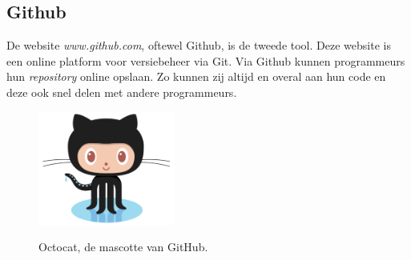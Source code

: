 \subsection{Github}

De website \textit{www.github.com}, oftewel Github, is de tweede tool.
Deze website is een online platform voor versiebeheer via Git. Via Github kunnen programmeurs hun \textit{repository} online opslaan.\cite{git:hello_world} Zo kunnen zij altijd en overal aan hun code en deze ook snel delen met andere programmeurs.

\begin{figure}[ht]
    \centering
    \includegraphics[width=0.4\textwidth]{illustraties/Octocat}
    \caption{Octocat, de mascotte van GitHub.}
    \cite{git:github}
    \label{fig:octocat}
\end{figure}

